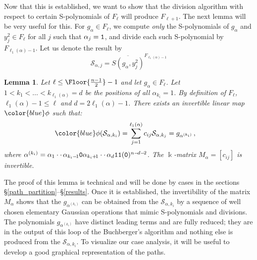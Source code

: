 \documentclass[10pt,a4paper]{article}
\newtheorem{lemma}{Lemma}[section]
\def\field{\Bbbk}
\DeclarePairedDelimiter\Floor\lfloor\rfloor
\begin{document}
Now that this is established, we want to  show that the division algorithm with respect to certain S-polynomials of $F_\ell$ will produce $F_{\ell+1}$.
The next lemma will be very useful for this.
For $g_\alpha\in F_\ell$, we compute {\sl only} the S-polynomials of $g_\alpha$ and $y_j^2\in F_\ell$ for all $j$ such that $\alpha_j=\textnormal{\texttt{1}}$, and divide each such S-polynomial by $F_{\ell_1(\alpha)-1}$.
Let us denote the result by
	$$\mathcal{S}_{\alpha, {j}} = \overline{S(g_{\alpha}, y^{2}_{j})}^{F_{\ell_1(\alpha)-1}}$$
\begin{lemma}
	\label{lemma_phi_map} Let $\ell \le \Floor{\frac{n-1}{2}}-1$
	and let $g_\alpha\in F_\ell$.
	Let  $1<k_1 < \dots < k_{\ell_1(\alpha)}= d$ be the positions of all $\alpha_{k_i} = 1$. By definition of $F_\ell$, $\ell_1(\alpha)-1\le\ell$ and $d=2\ell_1(\alpha)-1$.
	There exists an invertible linear map $\color{blue} \phi$ such that:
	\vskip -18pt
	\begin{align*}
	    \textnormal{$\color{blue} \phi$}(\mathcal{S}_{\alpha, k_i}) = \sum_{j=1}^{\ell_1(\alpha)} c_{ij} \mathcal{S}_{\alpha, {k_{j}}} &= g_{\alpha^{(k_i)}}\,,
	\end{align*}
	where $\alpha^{(k_i)} = \alpha_1 \cdot\cdot\, \alpha_{k_{i}-\!1} \textnormal{\texttt{0}} \alpha_{k_{i}+\!1} \cdot\cdot\, \alpha_{d}  
	\textnormal{\texttt{11}} (\textnormal{\texttt{0}})^{n-\!d-\!2}$.
	The $\field$-matrix $M_\alpha=[c_{ij}]$ is invertible.
\end{lemma}

The proof of this lemma is technical and will be done by cases in the sections \S\ref{path_partition}--\S\ref{results}.
Once it is established, the invertibility of the matrix $M_\alpha$ shows that the $g_{\alpha^{(k_i)}}$ can be obtained from the $\mathcal{S}_{\alpha, k_i}$
by a sequence of well chosen elementary Gaussian operations that mimic S-polynomials and divisions. The polynomials $g_{\alpha^{(k_i)}}$ have distinct leading terms 
and are fully reduced; they are in the output of this loop of the Buchberger's algorithm and nothing else is produced from the $\mathcal{S}_{\alpha, k_i}$.
To visualize our case analysis, it will be useful to develop a good graphical representation of the paths.
\end{document}
